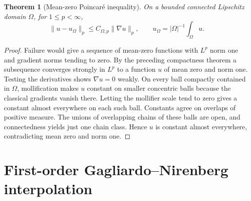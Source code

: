 \documentclass[11pt,oneside,openany]{book}
\newtheorem{theorem}{Theorem}[chapter]
\theoremstyle{definition}
\theoremstyle{remark}
\begin{document}
\begin{theorem}[Mean-zero Poincar\'e inequality]\label{p102:U5-01}
On a bounded connected Lipschitz domain \(\Omega\), for
\(1\le p<\infty\),
\[
 \|u-u_\Omega\|_p\le C_{\Omega,p}\|\nabla u\|_p,
 \qquad u_\Omega=|\Omega|^{-1}\int_\Omega u .
\]
\end{theorem}
\begin{proof}
Failure would give a sequence of mean-zero functions with \(L^p\)
norm one and gradient norms tending to zero. By the preceding
compactness theorem a subsequence converges strongly in \(L^p\)
to a function \(u\) of mean zero and norm one. Testing the
derivatives shows \(\nabla u=0\) weakly. On every ball compactly
contained in \(\Omega\), mollification makes \(u\) constant on smaller
concentric balls because the classical gradients vanish there.
Letting the mollifier scale tend to zero gives a constant almost
everywhere on each such ball. Constants agree on overlaps of
positive measure. The unions of overlapping chains of these balls
are open, and connectedness yields just one chain class. Hence \(u\)
is constant almost everywhere, contradicting mean zero and norm one.
\end{proof}

\section{First-order Gagliardo--Nirenberg interpolation}
\end{document}
